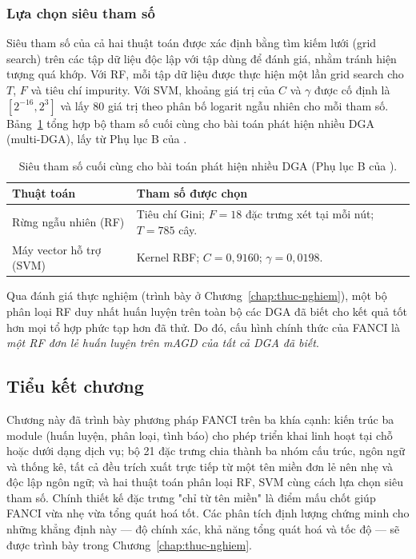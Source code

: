 \subsubsection{Lựa chọn siêu tham số}

Siêu tham số của cả hai thuật toán được xác định bằng tìm kiếm lưới (grid search) trên các tập dữ liệu độc lập với tập dùng để đánh giá, nhằm tránh hiện tượng quá khớp. Với RF, mỗi tập dữ liệu được thực hiện một lần grid search cho $T$, $F$ và tiêu chí impurity. Với SVM, khoảng giá trị của $C$ và $\gamma$ được cố định là $[2^{-16}, 2^{3}]$ và lấy 80 giá trị theo phân bố logarit ngẫu nhiên cho mỗi tham số. Bảng~\ref{tab:sieu-tham-so} tổng hợp bộ tham số cuối cùng cho bài toán phát hiện nhiều DGA (multi-DGA), lấy từ Phụ lục B của \cite{schuppen2018fanci}.

\begin{table}[H]
\centering
\caption{Siêu tham số cuối cùng cho bài toán phát hiện nhiều DGA (Phụ lục B của \cite{schuppen2018fanci}).}
\label{tab:sieu-tham-so}
\begin{tabularx}{\textwidth}{|>{\raggedright\arraybackslash}p{2.6cm}|>{\raggedright\arraybackslash}X|}
\hline
\rowcolor{LightCyan}
\textbf{Thuật toán} & \textbf{Tham số được chọn} \\
\hline
Rừng ngẫu nhiên (RF) & Tiêu chí Gini; $F = 18$ đặc trưng xét tại mỗi nút; $T = 785$ cây. \\
\hline
Máy vector hỗ trợ (SVM) & Kernel RBF; $C = 0{,}9160$; $\gamma = 0{,}0198$. \\
\hline
\end{tabularx}
\end{table}

Qua đánh giá thực nghiệm (trình bày ở Chương~\ref{chap:thuc-nghiem}), một bộ phân loại RF duy nhất huấn luyện trên toàn bộ các DGA đã biết cho kết quả tốt hơn mọi tổ hợp phức tạp hơn đã thử. Do đó, cấu hình chính thức của FANCI là \textit{một RF đơn lẻ huấn luyện trên mAGD của tất cả DGA đã biết}.

\subsection{Tiểu kết chương}

Chương này đã trình bày phương pháp FANCI trên ba khía cạnh: kiến trúc ba module (huấn luyện, phân loại, tình báo) cho phép triển khai linh hoạt tại chỗ hoặc dưới dạng dịch vụ; bộ 21 đặc trưng chia thành ba nhóm cấu trúc, ngôn ngữ và thống kê, tất cả đều trích xuất trực tiếp từ một tên miền đơn lẻ nên nhẹ và độc lập ngôn ngữ; và hai thuật toán phân loại RF, SVM cùng cách lựa chọn siêu tham số. Chính thiết kế đặc trưng "chỉ từ tên miền" là điểm mấu chốt giúp FANCI vừa nhẹ vừa tổng quát hoá tốt. Các phân tích định lượng chứng minh cho những khẳng định này --- độ chính xác, khả năng tổng quát hoá và tốc độ --- sẽ được trình bày trong Chương~\ref{chap:thuc-nghiem}.
